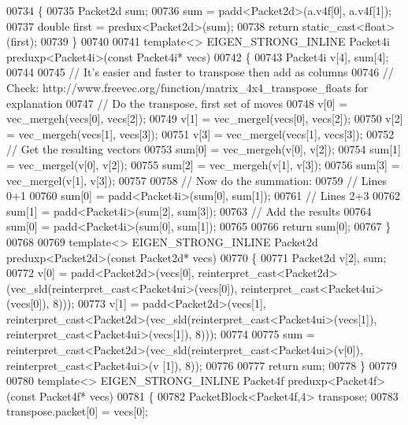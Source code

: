 \begin{DoxyCode}
{00734 \{
00735   Packet2d sum;
00736   sum = padd<Packet2d>(a.v4f[0], a.v4f[1]);
00737   \textcolor{keywordtype}{double} first = predux<Packet2d>(sum);
00738   \textcolor{keywordflow}{return} \textcolor{keyword}{static\_cast<}\textcolor{keywordtype}{float}\textcolor{keyword}{>}(first);
00739 \}
00740 
00741 \textcolor{keyword}{template}<> EIGEN\_STRONG\_INLINE Packet4i preduxp<Packet4i>(\textcolor{keyword}{const} Packet4i* vecs)
00742 \{
00743   Packet4i v[4], sum[4];
00744 
00745   \textcolor{comment}{// It's easier and faster to transpose then add as columns}
00746   \textcolor{comment}{// Check: http://www.freevec.org/function/matrix\_4x4\_transpose\_floats for explanation}
00747   \textcolor{comment}{// Do the transpose, first set of moves}
00748   v[0] = vec\_mergeh(vecs[0], vecs[2]);
00749   v[1] = vec\_mergel(vecs[0], vecs[2]);
00750   v[2] = vec\_mergeh(vecs[1], vecs[3]);
00751   v[3] = vec\_mergel(vecs[1], vecs[3]);
00752   \textcolor{comment}{// Get the resulting vectors}
00753   sum[0] = vec\_mergeh(v[0], v[2]);
00754   sum[1] = vec\_mergel(v[0], v[2]);
00755   sum[2] = vec\_mergeh(v[1], v[3]);
00756   sum[3] = vec\_mergel(v[1], v[3]);
00757 
00758   \textcolor{comment}{// Now do the summation:}
00759   \textcolor{comment}{// Lines 0+1}
00760   sum[0] = padd<Packet4i>(sum[0], sum[1]);
00761   \textcolor{comment}{// Lines 2+3}
00762   sum[1] = padd<Packet4i>(sum[2], sum[3]);
00763   \textcolor{comment}{// Add the results}
00764   sum[0] = padd<Packet4i>(sum[0], sum[1]);
00765 
00766   \textcolor{keywordflow}{return} sum[0];
00767 \}
00768 
00769 \textcolor{keyword}{template}<> EIGEN\_STRONG\_INLINE Packet2d preduxp<Packet2d>(\textcolor{keyword}{const} Packet2d* vecs)
00770 \{
00771   Packet2d v[2], sum;
00772   v[0] = padd<Packet2d>(vecs[0], \textcolor{keyword}{reinterpret\_cast<}Packet2d\textcolor{keyword}{>}(vec\_sld(reinterpret\_cast<Packet4ui>(vecs[0]), 
      reinterpret\_cast<Packet4ui>(vecs[0]), 8)));
00773   v[1] = padd<Packet2d>(vecs[1], \textcolor{keyword}{reinterpret\_cast<}Packet2d\textcolor{keyword}{>}(vec\_sld(reinterpret\_cast<Packet4ui>(vecs[1]), 
      reinterpret\_cast<Packet4ui>(vecs[1]), 8)));
00774  
00775   sum = \textcolor{keyword}{reinterpret\_cast<}Packet2d\textcolor{keyword}{>}(vec\_sld(reinterpret\_cast<Packet4ui>(v[0]), reinterpret\_cast<Packet4ui>(v
      [1]), 8));
00776 
00777   \textcolor{keywordflow}{return} sum;
00778 \}
00779 
00780 \textcolor{keyword}{template}<> EIGEN\_STRONG\_INLINE Packet4f preduxp<Packet4f>(\textcolor{keyword}{const} Packet4f* vecs)
00781 \{
00782   PacketBlock<Packet4f,4> transpose;
00783   transpose.packet[0] = vecs[0];
}
\end{DoxyCode}
